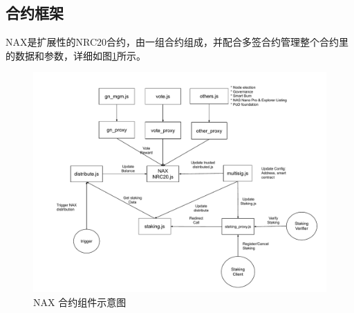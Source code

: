\subsection{合约框架}
NAX是扩展性的NRC20合约，由一组合约组成，并配合多签合约管理整个合约里的数据和参数，详细如图\ref{fig:nax_framework}所示。

\begin{figure}[htbp]
  \centering
    \includegraphics[width=1\textwidth]{../common/nax.pdf}
    \caption{NAX 合约组件示意图 \label{fig:nax_framework}}
\end{figure}
